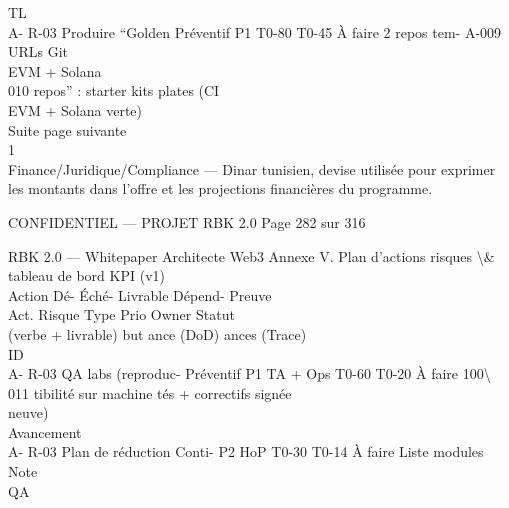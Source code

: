 \documentclass[12pt,landscape,a4paper]{article}
\newenvironment{confidential}
{\begin{tcolorbox}[
    colback=rbkred!5!white,
    colframe=rbkred!75!black,
    title=CONFIDENTIEL,
    fonttitle=\bfseries\color{white},
    coltitle=rbkred!75!black,
    breakable,
    enhanced,
    frame hidden,
    borderline west={2pt}{0pt}{rbkred!75!black}
]}
{\end{tcolorbox}}
\begin{document}
TL\\
A- R-03     Produire “Golden Préventif P1                 T0-80 T0-45 À faire    2 repos tem-   A-009      URLs Git\\
EVM + Solana\\
010         repos” : starter kits                                                plates (CI\\
EVM + Solana                                                         verte)\\
Suite page suivante\\
\vspace{0.5em}
1\\
Finance/Juridique/Compliance — Dinar tunisien, devise utilisée pour exprimer les montants dans l’offre et les projections financières du programme.\\
\vspace{0.5em}
\vspace{0.5em}
\begin{confidential}CONFIDENTIEL — PROJET RBK 2.0                                                 Page 282 sur 316\end{confidential}
RBK 2.0 — Whitepaper Architecte Web3                                                                         Annexe V. Plan d’actions risques \textbackslash{}& tableau de bord KPI (v1)\\
\vspace{0.5em}
\vspace{0.5em}
Action                                            Dé-   Éché-           Livrable        Dépend- Preuve\\
Act. Risque                      Type    Prio Owner                       Statut\\
(verbe + livrable)                                but   ance            (DoD)           ances   (Trace)\\
ID\\
A- R-03     QA labs (reproduc- Préventif P1   TA + Ops        T0-60 T0-20 À faire   100\textbackslash{}%
011         tibilité sur machine                                                    tés + correctifs           signée\\
neuve)\\
Avancement\\
A- R-03     Plan de réduction Conti-        P2   HoP          T0-30 T0-14 À faire   Liste modules         Note\\
QA\\
\end{document}
